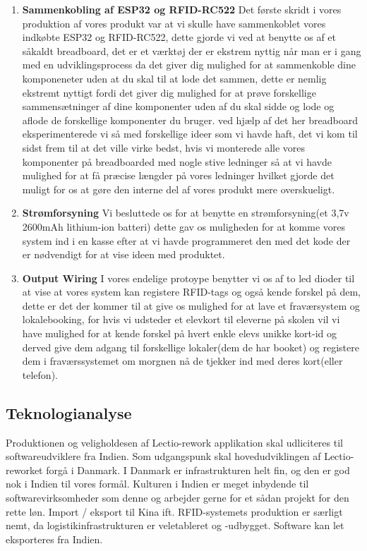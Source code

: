     \begin{enumerate}
        \item \textbf{Sammenkobling af ESP32 og RFID-RC522}
            Det første skridt i vores produktion af vores produkt var at vi skulle have sammenkoblet vores indkøbte ESP32 og RFID-RC522, dette gjorde vi ved at benytte os af et såkaldt 
            breadboard, det er et værktøj der er ekstrem nyttig når man er i gang med en udviklingsprocess da det giver dig mulighed for at sammenkoble dine komponeneter uden at du skal til 
            at lode det sammen, dette er nemlig ekstremt nyttigt fordi det giver dig mulighed for at prøve forskellige sammensætninger af dine komponenter uden af du skal sidde og lode og 
            aflode de forskellige komponenter du bruger. ved hjælp af det her breadboard eksperimenterede vi så med forskellige ideer som vi havde haft, det vi kom til sidst frem til at det 
            ville virke bedst, hvis vi monterede alle vores komponenter på breadboarded med nogle stive ledninger så at vi havde mulighed for at få præcise længder på vores ledninger hvilket 
            gjorde det muligt for os at gøre den interne del af vores produkt mere overskueligt.

        \item \textbf{Strømforsyning} 
            Vi besluttede os for at benytte en strømforsyning(et 3,7v 2600mAh lithium-ion batteri) dette gav os muligheden for at komme vores system ind i en kasse efter at vi havde programmeret
            den med det kode der er nødvendigt for at vise ideen med produktet.


        \item \textbf{Output Wiring}
            I vores endelige protoype benytter vi os af to led dioder til at vise at vores system kan registere RFID-tags og også kende forskel på dem, dette er det der kommer til at give os mulighed 
            for at lave et fraværsystem og lokalebooking, for hvis vi udsteder et elevkort til eleverne på skolen vil vi have mulighed for at kende forskel på hvert enkle elevs unikke kort-id og derved 
            give dem adgang til forskellige lokaler(dem de har booket) og registere dem i fraværssystemet om morgnen nå de tjekker ind med deres kort(eller telefon).

    \end{enumerate}

                                                                         

    \subsection{Teknologianalyse}
        Produktionen og veligholdesen af Lectio-rework applikation skal udliciteres til softwareudviklere fra Indien.
        Som udgangspunk skal hovedudviklingen af Lectio-reworket forgå i Danmark. I Danmark er infrastrukturen helt fin, og den er god nok i Indien til vores formål. Kulturen i Indien
        er meget inbydende til softwarevirksomheder som denne og arbejder gerne for et sådan projekt for den rette løn. Import / eksport til Kina ift. RFID-systemets 
        produktion er særligt nemt, da logistikinfrastrukturen er veletableret og -udbygget. Software kan let eksporteres fra Indien.
